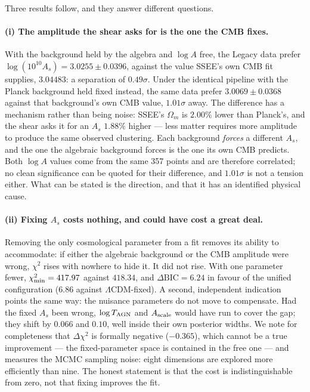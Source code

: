 \documentclass[12pt,a4paper]{article}
\newcommand{\SSEE}{\textsc{SSEE}}
\begin{document}
Three results follow, and they answer different questions.

\paragraph{(i) The amplitude the shear asks for is the one the CMB fixes.}
With the background held by the algebra and $\log A$ free, the Legacy data
prefer $\log(10^{10}A_s) = 3.0255\pm0.0396$, against the value \SSEE{}'s own CMB
fit supplies, $3.04483$: a separation of $0.49\sigma$. Under the identical
pipeline with the Planck background held fixed instead, the same data prefer
$3.0069\pm0.0368$ against that background's own CMB value, $1.01\sigma$ away.
The difference has a mechanism rather than being noise: \SSEE{}'s $\Omega_m$ is
$2.00\%$ lower than Planck's, and the shear asks it for an $A_s$ $1.88\%$
higher --- less matter requires more amplitude to produce the same observed
clustering. Each background \emph{forces} a different $A_s$, and the one the
algebraic background forces is the one its own CMB predicts. Both $\log A$
values come from the same 357 points and are therefore correlated; no clean
significance can be quoted for their difference, and $1.01\sigma$ is not a
tension either. What can be stated is the direction, and that it has an
identified physical cause.

\paragraph{(ii) Fixing $A_s$ costs nothing, and could have cost a great deal.}
Removing the only cosmological parameter from a fit removes its ability to
accommodate: if either the algebraic background or the CMB amplitude were wrong,
$\chi^2$ rises with nowhere to hide it. It did not rise. With one parameter
fewer, $\chi^2_{\rm min}=417.97$ against $418.34$, and
$\Delta\mathrm{BIC}=6.24$ in favour of the unified configuration
($6.86$ against $\Lambda$CDM-fixed). A second, independent indication points
the same way: the nuisance parameters do not move to compensate. Had the fixed
$A_s$ been wrong, $\log T_{\rm AGN}$ and $A_{\rm scale}$ would have run to cover
the gap; they shift by $0.066$ and $0.10$, well inside their own posterior
widths. We note for completeness that $\Delta\chi^2$ is formally negative
($-0.365$), which cannot be a true improvement --- the fixed-parameter space is
contained in the free one --- and measures the MCMC sampling noise: eight
dimensions are explored more efficiently than nine. The honest statement is
that the cost is indistinguishable from zero, not that fixing improves the fit.
\end{document}

